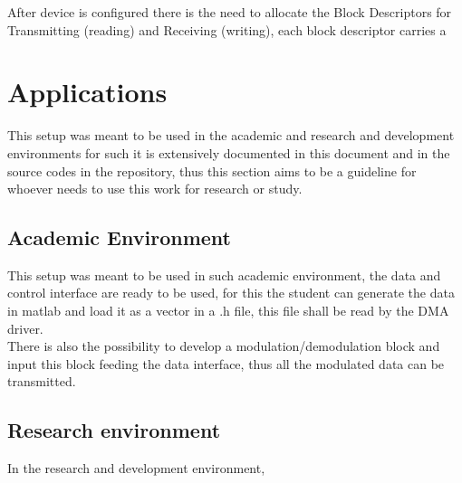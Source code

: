 After device is configured there is the need to allocate the Block Descriptors
for Transmitting (reading) and Receiving (writing), each block descriptor carries
a




\section{Applications}

This setup was meant to be used in the academic and research and development
environments for such it is extensively documented in this document and in the
source codes in the repository, thus this section aims to be a guideline for whoever needs to
use this work for research or study.

\subsection{Academic Environment}

This setup was meant to be used in such academic environment, the data and control
interface are ready to be used, for this the student can generate the data in
matlab and load it as a vector in a .h file, this file shall be read by the DMA
driver.\\
There is also the possibility to develop a modulation/demodulation block
and input this block feeding the data interface, thus all the modulated data can
be transmitted.

\subsection{Research environment}

In the research and development environment,
